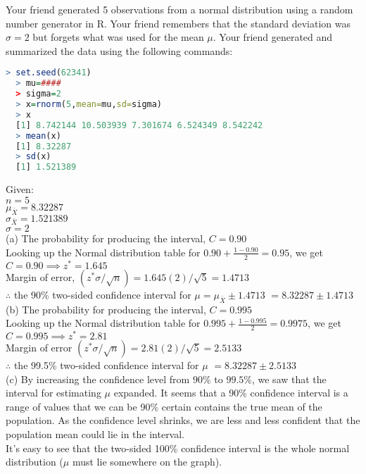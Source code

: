 \documentclass[boxes, qed]{homework}
\begin{document}
\begin{problem}Your friend generated 5 observations from a normal distribution using a random number
  generator in R. Your friend remembers that the standard deviation was $\sigma=2$ but forgets 
  what was used for the mean $\mu$. Your friend generated and summarized the data using the following commands:
  \begin{lstlisting}[backgroundcolor = \color{lightgray},language = R]
  > set.seed(62341)
  > mu=####
  > sigma=2
  > x=rnorm(5,mean=mu,sd=sigma)
  > x
  [1] 8.742144 10.503939 7.301674 6.524349 8.542242
  > mean(x)
  [1] 8.32287
  > sd(x)
  [1] 1.521389
  \end{lstlisting}
\end{problem}
\begin{solution}
  Given:\\
  $n=5$\\
  $\mu_{\bar{X}}=8.32287$\\
  $\sigma_{\bar{X}}=1.521389$\\
  $\sigma=2$\\

  (a) The probability for producing the interval, $C=0.90$\\
  Looking up the Normal distribution table
  for $0.90+\frac{1-0.90}{2}=0.95$, we get
  $C=0.90 \implies z^*=1.645$\\
  Margin of error, $(z^*\sigma/\sqrt{n}) = 1.645(2)/\sqrt{5} = 1.4713$\\

  $\therefore$ the 90\% two-sided confidence interval for $\mu = \mu_{\bar{X}}\pm{1.4713}$
  $=\boxed{8.32287\pm{1.4713}}$\\

  (b) The probability for producing the interval, $C=0.995$\\
  Looking up the Normal distribution table
  for $0.995+\frac{1-0.995}{2}=0.9975$, we get
  $C=0.995 \implies z^*=2.81$\\
  Margin of error $(z^*\sigma/\sqrt{n}) = 2.81(2)/\sqrt{5} = 2.5133$\\

  $\therefore$ the 99.5\% two-sided confidence interval for $\mu$
  $=\boxed{8.32287\pm{2.5133}}$\\

  (c) By increasing the confidence level from $90\%$ to $99.5\%$, 
  we saw that the interval for estimating $\mu$ expanded. It seems
  that a 90\% confidence interval is a range of values that we can be 90\% 
  certain contains the true mean of the population. As the confidence level
  shrinks, we are less and less confident that the population mean
  could lie in the interval.\\

  It's easy to see that the two-sided 100\% confidence interval
  is the whole normal distribution ($\mu$ must lie somewhere on the graph).
\end{solution}
\end{document}
